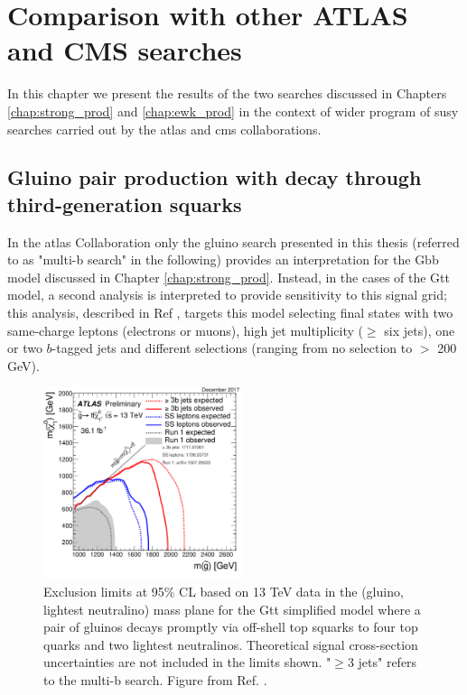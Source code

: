 \chapter{Comparison with other ATLAS and CMS searches}
\label{chap:summary_susy}

In this chapter we present the results of the two searches discussed in Chapters \ref{chap:strong_prod} and \ref{chap:ewk_prod} in the context of
wider program of \gls{susy} searches carried out by the \gls{atlas} and \gls{cms} collaborations. 

\section{Gluino pair production with decay through third-generation squarks}

In the \gls{atlas} Collaboration only the gluino search presented in this thesis (referred to as "multi-b search" in the following) 
provides an interpretation for the Gbb model 
discussed in Chapter \ref{chap:strong_prod}.
Instead, in the cases of the Gtt model, a second analysis is interpreted to provide sensitivity  to this 
signal grid; this analysis, described in Ref \cite{Aaboud:2017dmy}, targets this model selecting final states with two same-charge 
leptons (electrons or muons), high jet multiplicity ($\geq$ six jets), one or two $b$-tagged jets and different \met selections 
(ranging from no \met selection to \met $>$ 200 GeV).

\begin{figure}[htbp]
	\centering
	\includegraphics[width=0.52\textwidth]{figures/summary_plots/ATLAS_SUSY_Gtt.pdf}
	\caption{Exclusion limits at 95\% CL based on 13 TeV data in the (gluino, lightest neutralino) 
	mass plane for the Gtt simplified model where a pair of gluinos decays promptly via off-shell top 
	squarks to four top quarks and two lightest neutralinos. Theoretical signal cross-section uncertainties are 
	not included in the limits shown. "$\geq 3$ jets" refers to the multi-b search. Figure from Ref. \cite{atlasSUSYSummary}.
	} 
	\label{fig:summary_atlas_Gtt}
\end{figure}


